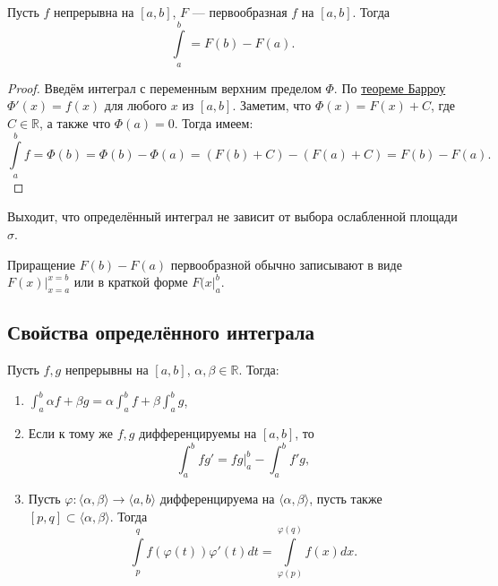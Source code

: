 \hypertarget{t9}{}
\begin{theorem}
	Пусть $f$ непрерывна на $[a, b]$, $F$ --- первообразная $f$ на $[a, b]$. Тогда \[
		\int\limits_a^b = F(b) - F(a).
	\]
\end{theorem}
\begin{proof}
	Введём интеграл с переменным верхним пределом $\Phi$. По \hyperlink{t8}{теореме Барроу} $\Phi'(x) = f(x)$ для любого $x$ из $[a, b]$.
	Заметим, что $\Phi(x) = F(x) + C$, где $C \in \mathbb{R}$, а также что $\Phi(a) = 0$. Тогда имеем: \[
		\int\limits_a^b f = \Phi(b) = \Phi(b) - \Phi(a) = (F(b) + C) - (F(a) + C) = F(b) - F(a). 
	\]
\end{proof}

\begin{nremark}
	Выходит, что определённый интеграл не зависит от выбора ослабленной площади $\sigma$.
\end{nremark}

\begin{nremark}
	Приращение $F(b) - F(a)$ первообразной обычно записывают в виде $F(x) \bigg|_{x = a}^{x = b}$ или в краткой форме $F(x \bigg|_a^b$.
\end{nremark}

\subsection{Свойства определённого интеграла}

\begin{theorem}
	Пусть $f, g$ непрерывны на $[a, b]$, $\alpha, \beta \in \mathbb{R}$. Тогда:
	\begin{enumerate}
		\item \(\displaystyle \int_a^b \alpha f + \beta g = \alpha \int_a^b f + \beta \int_a^b g\),
		\item Если к тому же $f, g$ дифференцируемы на $[a, b]$, то \[
			\int_a^b fg' = fg \bigg|_a^b - \int_a^b f'g,
		\]
		\item Пусть $\varphi: \langle \alpha, \beta \rangle \to \langle a, b \rangle$ дифференцируема на $\langle \alpha, \beta \rangle$,
		пусть также $[p, q] \subset \langle \alpha, \beta \rangle$. Тогда \[
			\int\limits_p^q f(\varphi(t))\varphi'(t) dt = \int\limits_{\varphi(p)}^{\varphi(q)} f(x) dx.
		\]
	\end{enumerate}
\end{theorem}

